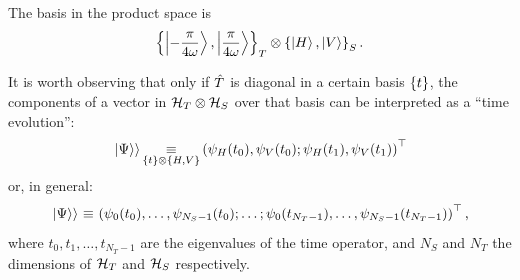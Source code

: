 The basis in the product space is
\begin{equation}\label{eq:moreva:t_overall_basis}
  \qty{\ket{-\frac{\pi}{4\omega}}, \ket{\frac{\pi}{4\omega}}}_T \otimes \qty{\ket{H}, \ket{V}}_S
  \, \text{.}
\end{equation}

It is worth observing that
only if $\hat{T}$ is diagonal in a certain basis $\qty{t}$,
the components of a vector in $\mathcal{H}_T \otimes \mathcal{H}_S$
over that basis
can be interpreted as a ``time evolution'':
\begin{equation}\label{eq:timepicks2}
  \left.\left| \Psi \right\rangle\right\rangle
  \operatorname*{\,\equiv\,}_{\qty{t} \otimes \qty{H,V}}
  \qty(\psi_H(t_0), \psi_V(t_0); \psi_H(t_1), \psi_V(t_1))^\top
\end{equation}
or, in general:
\begin{equation}\label{eq:timepicksN}
  \left.\left| \Psi \right\rangle\right\rangle
  \operatorname*{\,\equiv\,}
  \qty(
    \psi_0(t_0),
    \dotsc,
    \psi_{N_{S} - 1}(t_0);
    \dots;
    \psi_0(t_{N_{T}-1}),
    \dotsc,
    \psi_{N_{S} - 1}(t_{N_{T}-1})
  )^\top \,\text{,}
\end{equation}
where
$t_0, t_1, \dots, t_{N_{T}-1}$ are the eigenvalues of the time operator,
and
$N_{S}$ and $N_{T}$ the dimensions of $\mathcal{H}_T$ and $\mathcal{H}_S$ respectively.

